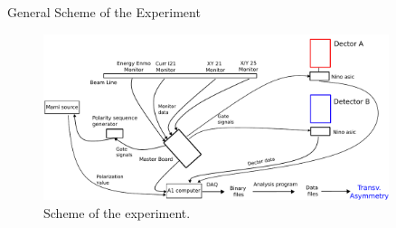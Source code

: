 \documentclass[9pt,a4paper]{beamer}
\newcommand{\commento}[1]{}
\begin{document}
\begin{frame}{General Scheme of the Experiment}

\begin{figure}[hbtp]
\centering
\includegraphics[width = 0.9\textwidth]{figures/Electronic_scheme.pdf}
\caption{Scheme of the experiment.}
\end{figure}
\end{frame}

\commento{
\begin{frame}{Detector Tests}

\end{frame}}
\end{document}
